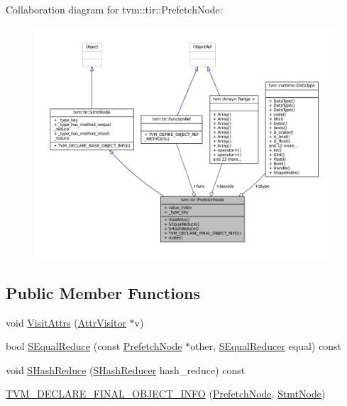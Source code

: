 Collaboration diagram for tvm\+:\+:tir\+:\+:Prefetch\+Node\+:
\nopagebreak
\begin{figure}[H]
\begin{center}
\leavevmode
\includegraphics[width=350pt]{classtvm_1_1tir_1_1PrefetchNode__coll__graph}
\end{center}
\end{figure}
\subsection*{Public Member Functions}
\begin{DoxyCompactItemize}
\item 
void \hyperlink{classtvm_1_1tir_1_1PrefetchNode_a491c03fa62a96b66b7ea0c8e9095b98e}{Visit\+Attrs} (\hyperlink{classtvm_1_1AttrVisitor}{Attr\+Visitor} $\ast$v)
\item 
bool \hyperlink{classtvm_1_1tir_1_1PrefetchNode_a40defcee76278429e8c6c3c981206d36}{S\+Equal\+Reduce} (const \hyperlink{classtvm_1_1tir_1_1PrefetchNode}{Prefetch\+Node} $\ast$other, \hyperlink{classtvm_1_1SEqualReducer}{S\+Equal\+Reducer} equal) const 
\item 
void \hyperlink{classtvm_1_1tir_1_1PrefetchNode_ad560931be434382ad0be20bb6bb7b827}{S\+Hash\+Reduce} (\hyperlink{classtvm_1_1SHashReducer}{S\+Hash\+Reducer} hash\+\_\+reduce) const 
\item 
\hyperlink{classtvm_1_1tir_1_1PrefetchNode_a2ad09dce7433dbd22eb1432a3e77f474}{T\+V\+M\+\_\+\+D\+E\+C\+L\+A\+R\+E\+\_\+\+F\+I\+N\+A\+L\+\_\+\+O\+B\+J\+E\+C\+T\+\_\+\+I\+N\+FO} (\hyperlink{classtvm_1_1tir_1_1PrefetchNode}{Prefetch\+Node}, \hyperlink{classtvm_1_1tir_1_1StmtNode}{Stmt\+Node})
\end{DoxyCompactItemize}
